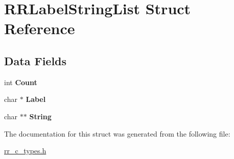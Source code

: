 \hypertarget{struct_r_r_label_string_list}{
\section{\-R\-R\-Label\-String\-List \-Struct \-Reference}
\label{struct_r_r_label_string_list}
}
\subsection*{\-Data \-Fields}
\begin{DoxyCompactItemize}
\item 
\hypertarget{struct_r_r_label_string_list_aad462966ed963f892117056de1eba502}{
int {\bfseries \-Count}}
\label{struct_r_r_label_string_list_aad462966ed963f892117056de1eba502}

\item 
\hypertarget{struct_r_r_label_string_list_af91fd2b26f73a15052d23933bee0ed5a}{
char $\ast$ {\bfseries \-Label}}
\label{struct_r_r_label_string_list_af91fd2b26f73a15052d23933bee0ed5a}

\item 
\hypertarget{struct_r_r_label_string_list_acdbc34377baf3e52d9044aada0f2f511}{
char $\ast$$\ast$ {\bfseries \-String}}
\label{struct_r_r_label_string_list_acdbc34377baf3e52d9044aada0f2f511}

\end{DoxyCompactItemize}


\-The documentation for this struct was generated from the following file\-:\begin{DoxyCompactItemize}
\item 
\hyperlink{rr__c__types_8h}{rr\-\_\-c\-\_\-types.\-h}\end{DoxyCompactItemize}
